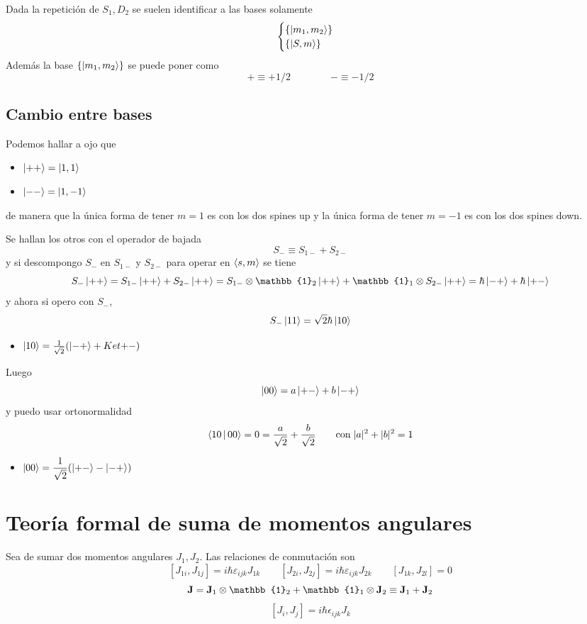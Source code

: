 \documentclass[10pt,oneside]{CBFT_book}
\begin{document}
Dada la repetición de $S_1,D_2$ se suelen identificar a las bases solamente 
\[
	\begin{cases}
	\{ \Ket{m_1,m_2} \} \\
	\{ \Ket{S,m} \}
	\end{cases}
\]
Además la base $\{ \Ket{m_1,m_2}\}$ se puede poner como 
\[
	+ \equiv + 1/2 \qquad\qquad - \equiv - 1/2
\]

\subsection{Cambio entre bases}

Podemos hallar a ojo que 
\begin{itemize}
 \item $\Ket{++} = \Ket{1,1}$
 \item $\Ket{--} = \Ket{1,-1}$
\end{itemize}

de manera que la única forma de tener $m=1$ es con los dos spines up y la única forma de tener $m=-1$ es con 
los dos spines down.

Se hallan los otros con el operador de bajada
\[
	S_- \equiv S_{1-} + S_{2-}
\]
y si descompongo $S_-$ en $S_{1-}$ y $S_{2-}$ para operar en $\Braket{s,m}$ se tiene 
\[
	S_- \Ket{++} = S_{1-}\Ket{++} + S_{2-}\Ket{++} = S_{1-}\otimes\mathbb{1}_2\Ket{++} +
	\mathbb{1}_1\otimes S_{2-}\Ket{++} = \hbar\Ket{-+} + \hbar\Ket{+-}
\]
y ahora si opero con $S_-$,
\[
	S_-\Ket{11} = \sqrt{2} \hbar \Ket{10}
\]
\begin{itemize}
	\item $\Ket{10} = \frac{1}{\sqrt{2}}( \Ket{-+} + Ket{+-} ) $
\end{itemize}


Luego
\[
	\Ket{00} = a \Ket{+-} + b\Ket{-+}
\]
y puedo usar ortonormalidad 
\[
	\Braket{10|00} = 0 = \frac{a}{\sqrt{2}} + \frac{b}{\sqrt{2}} \qquad \text{con} \; |a|^2 + |b|^2 = 1
\]
\begin{itemize}
	\item $\displaystyle \Ket{00} = \frac{1}{\sqrt{2}}( \Ket{+-} - \Ket{-+} ) $
\end{itemize}


\section{Teoría formal de suma de momentos angulares}

Sea de sumar dos momentos angulares $J_1, J_2$. Las relaciones de conmutación son
\[
	[J_{1i},J_{1j}] = i\hbar \varepsilon_{ijk}J_{1k} \qquad 
	[J_{2i},J_{2j}] = i\hbar \varepsilon_{ijk}J_{2k} \qquad
	[J_{1k},J_{2l}] = 0
\]
\[
	\vb{J} = \vb{J}_1 \otimes \mathbb{1}_2 + \mathbb{1}_1\otimes \vb{J}_2 \equiv \vb{J}_1 + \vb{J}_2
\]
\[
	[J_i, J_j] = i\hbar\epsilon_{ijk}J_k
\]
\end{document}
